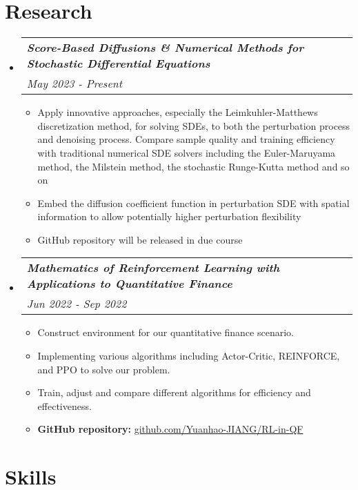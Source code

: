 \documentclass[12pt, a4paper]{article}
\makeatletter
\newcommand{\resumeSection}[1]{
    \section*{#1}
}
\newcommand{\resumeResearchItm}[2]{
\item
    \begin{tabular*}{0.96\textwidth}{@{}l@{\extracolsep{\fill}}r@{}}
        \hspace{-1.5mm}\textit{\textbf{#1}} & \\
        \hspace{0.5mm}\textit{#2} &
    \end{tabular*}
}
\newcommand{\resumeSectionSubItm}[2]{
\item
    \textbf{\parbox[t]{4.7cm}{#1\hfill}}\parbox[t]{12.5cm}{#2}\vspace{-2mm}
}
\newcommand{\resumeSectionSubItmI}[1]{
\item {#1}\vspace{-2mm}
}
\newcommand{\resumeSectionSubItmII}[2]{
\item \textbf{#1: }{#2}\vspace{-2mm}
}
\makeatother
\begin{document}
\resumeSection{Research}
\begin{itemize}[leftmargin=*]
    \resumeResearchItm{Score-Based Diffusions \& Numerical Methods for
    Stochastic Differential Equations}{May 2023 - Present}
    \vspace{-2mm}
    \begin{itemize}[leftmargin=*]
        \resumeSectionSubItmI{Apply innovative approaches, especially the
            Leimkuhler-Matthews discretization method, for solving SDEs, to both
            the perturbation process and denoising process. Compare sample
            quality and training efficiency with traditional numerical SDE
            solvers including the Euler-Maruyama method, the Milstein method,
        the stochastic Runge-Kutta method and so on}
        \resumeSectionSubItmI{Embed the diffusion coefficient function in
            perturbation SDE with spatial information to allow potentially
        higher perturbation flexibility}
        \resumeSectionSubItmI{GitHub repository will be released in due course}
    \end{itemize}
    \vspace{1mm}
    \resumeResearchItm{
        Mathematics of Reinforcement Learning with Applications to
        Quantitative Finance
    }{Jun 2022 - Sep 2022}
    \vspace{-2mm}
    \begin{itemize}[leftmargin=*]
        \resumeSectionSubItmI{
            Construct environment for our quantitative finance scenario.
        }
        \resumeSectionSubItmI{
            Implementing various algorithms including Actor-Critic, REINFORCE,
            and PPO to solve our problem.
        }
        \resumeSectionSubItmI{
            Train, adjust and compare different algorithms for efficiency and
            effectiveness.
        }
        \resumeSectionSubItmII{GitHub repository}{
        \href{https://github.com/Yuanhao-JIANG/RL-in-QF}
        {github.com/Yuanhao-JIANG/RL-in-QF}}
    \end{itemize}
\end{itemize}
\vspace{-2mm}

\resumeSection{Skills}
\vspace{-1mm}
\end{document}
